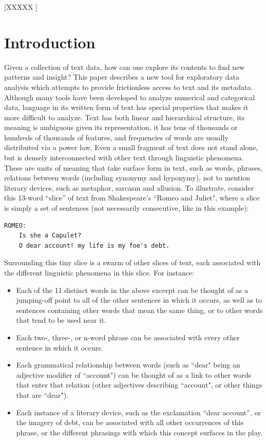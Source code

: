 \documentclass{sig-alternate}
\begin{document}

[XXXXX ]


\section{Introduction}
Given a collection of text data, how can one explore its contents to find new patterns and insight?  This paper describes a new tool for exploratory data analysis \cite{tukey} which attempts to provide frictionless access to text and its metadata.  Although many tools have been developed to analyze numerical and categorical data, language in its written form of text has special properties that makes it more difficult to analyze. Text has both linear and hierarchical structure, its meaning is ambiguous given its representation, it has tens of thousands or hundreds of thousands of features, and frequencies of words are usually distributed via a power law.   Even a small fragment of text does not stand alone, but is densely interconnected with other text through linguistic phenomena.  These are units of meaning that take surface form in text, such as words, phrases, relations between words (including synonymy and hyponymy), not to mention literary devices, such as metaphor, sarcasm and allusion. To illustrate, consider this 13-word ``slice'' of text from Shakespeare's ``Romeo and Juliet", where a slice is simply a set of sentences (not necessarily consecutive, like in this example):

\begin{verbatim}
ROMEO:
    Is she a Capulet?
    O dear account! my life is my foe's debt.
\end{verbatim}

Surrounding this tiny slice is a swarm of other slices of text, each associated with the different linguistic phenomena in this slice. For instance:
\begin{itemize}
\item Each of the 11 distinct words in the above excerpt can be thought of as a jumping-off point to all of the other sentences in which it occurs, as well as to sentences containing other words that mean the same thing, or to other words that tend to be used near it.
\item Each  two-, three-, or n-word phrase can be associated with every other sentence in which it occurs.
\item  Each grammatical relationship between words (such as ``dear" being an adjective modifier of  ``account") can be thought of as a link to other words that enter that relation (other adjectives describing ``account", or other things that are ``dear").
\item Each instance of a literary device, such as the exclamation ``dear account'', or the imagery of debt, can be associated with all other occurrences of this phrase, or the different phrasings with which this concept surfaces in the play.
\end{itemize}
\end{document}
